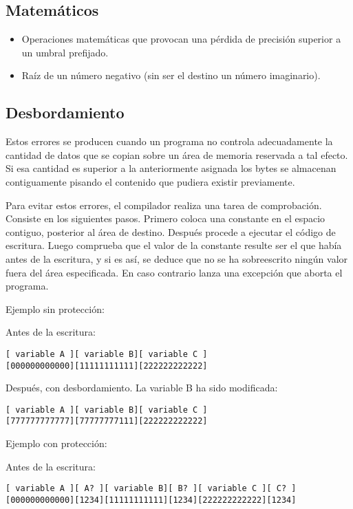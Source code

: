 \documentclass[12pt,a4paper]{article}
\begin{document}
\subsection{Matemáticos}
\begin{itemize}
\item Operaciones matemáticas que provocan una pérdida de precisión superior a 
	un umbral prefijado.
\item Raíz de un número negativo (sin ser el destino un número imaginario).
\end{itemize}

\subsection {Desbordamiento}
Estos errores se producen cuando un programa no controla adecuadamente la 
cantidad de datos que se copian sobre un área de memoria reservada a tal efecto. 
Si esa cantidad es superior a la anteriormente asignada los bytes se almacenan 
contiguamente pisando el contenido que pudiera existir previamente.

Para evitar estos errores, el compilador realiza una tarea de comprobación.  
Consiste en los siguientes pasos. Primero coloca una constante en el espacio 
contiguo, posterior al área de destino. Después procede a ejecutar el código de 
escritura. Luego comprueba que el valor de la constante resulte ser el que había 
antes de la escritura, y si es así, se deduce que no se ha sobreescrito ningún 
valor fuera del área especificada. En caso contrario lanza una excepción que 
aborta el programa.

Ejemplo sin protección:

Antes de la escritura:
\begin{lstlisting}
[ variable A ][ variable B][ variable C ]
[000000000000][11111111111][222222222222]
\end{lstlisting}

Después, con desbordamiento. La variable B ha sido modificada:
\begin{lstlisting}
[ variable A ][ variable B][ variable C ]
[777777777777][77777777111][222222222222]
\end{lstlisting}

Ejemplo con protección:

Antes de la escritura:
\begin{lstlisting}
[ variable A ][ A? ][ variable B][ B? ][ variable C ][ C? ]
[000000000000][1234][11111111111][1234][222222222222][1234]
\end{lstlisting}
\end{document}
